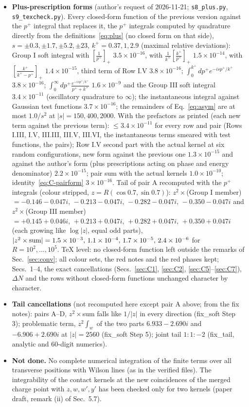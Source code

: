 \begin{itemize}
\item \textbf{Plus-prescription forms} (author's request of 2026-11-21; \texttt{s8\_plus.py}, \texttt{s9\_texcheck.py}). Every closed-form function of the previous version against the $p^{+}$ integral that replaces it, the $p^{+}$ integrals computed by quadrature directly from the definitions~\eqref{eq:plus} (no closed form on that side), $s=\pm0.3,\pm1.7,\pm5.2,\pm23$, $k^{+}=0.37,1,2.9$ (maximal relative deviations): Group I soft integral with $[\frac{1}{p^{+}}]_{+}$ $3.5\times10^{-16}$, with $\frac{1}{k^{+}}[\frac{k^{+}}{p^{+}}]_{+}$ $1.5\times10^{-14}$, with $[\frac{k^{+}}{k^{+}-p^{+}}]_{+}$ $1.4\times10^{-15}$, third term of Row I.V $3.8\times10^{-16}$; $\int_{0}^{k^{+}}dp^{+}e^{-isp^{+}/k^{+}}$ $3.8\times10^{-16}$; $\int_{0}^{\infty}dp^{+}\frac{e^{-isp^{+}/k^{+}}}{p^{+}+k^{+}}$ $1.6\times10^{-9}$ and the Group III soft integral $3.4\times10^{-11}$ (oscillatory quadrature to $\infty$); the instantaneous integral against Gaussian test functions $3.7\times10^{-16}$; the remainders of Eq.~\eqref{eq:asym} are at most $1.0/s^{2}$ at $|s|=150,400,2000$. With the prefactors as printed (each new term against the previous term): $\le3.4\times10^{-11}$ for every row and pair (Rows I.III, I.V, III.III, III.V, III.VI, the instantaneous terms smeared with test functions, the pairs); Row I.V second part with the actual kernel at six random configurations, new form against the previous one $1.3\times10^{-15}$ and against the author's form (plus prescriptions acting on phase and energy denominator) $2.2\times10^{-15}$; pair sum with the actual kernels $1.0\times10^{-10}$; identity~\eqref{eq:C-pairform} $3\times10^{-16}$. Tail of pair A recomputed with the $p^{+}$ integrals (colour stripped, $z=R(\cos0.7,\sin0.7)$): $z^{2}\times$(Group I member) $=-0.146-0.047i,\,-0.213-0.047i,\,-0.282-0.047i,\,-0.350-0.047i$ and $z^{2}\times$(Group III member) $=+0.145+0.046i,\,+0.213+0.047i,\,+0.282+0.047i,\,+0.350+0.047i$ (each growing like $\log|z|$, equal odd parts), $|z^{2}\times{\rm sum}|=1.5\times10^{-3},\,1.1\times10^{-4},\,1.7\times10^{-5},\,2.4\times10^{-6}$ for $R=10^{2},\dots,10^{5}$. TeX level: no closed-form function left outside the remarks of Sec.~\ref{sec:conv}; all colour sets, the red notes and the red phases kept; Secs.~1--4, the exact cancellations (Secs.~\ref{sec:C1}, \ref{sec:C2}, \ref{sec:C5}--\ref{sec:C7}), $\Delta N$ and the rows without closed-form functions unchanged character by character.
\item \textbf{Tail cancellations} (not recomputed here except pair A above; from the fix notes): pairs A--D, $z^{2}\times$sum falls like $1/|z|$ in every direction (fix\_soft Step 3); problematic term, $z^{2}\int_{w}$ of the two parts $6.933-2.690i$ and $-6.906+2.690i$ at $|z|=2560$ (fix\_soft Step 5); joint tail $1:1:-2$ (fix\_tail, analytic and 60-digit numerics).
\item \textbf{Not done.} No complete numerical integration of the finite terms over all transverse positions with Wilson lines (as in the verified files). The integrability of the contact kernels at the new coincidences of the merged charge point with $z,w,w',y'$ has been checked only for two kernels (paper draft, remark (ii) of Sec.~5.7).
\end{itemize}
